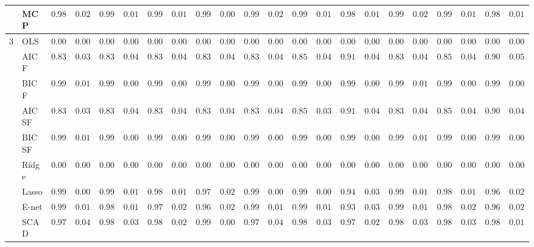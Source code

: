 \begin{tabular}{p{0.2cm}p{1cm}|p{0.6cm}p{0.6cm}|p{0.6cm}p{0.6cm}p{0.6cm}p{0.6cm}p{0.6cm}p{0.6cm}|p{0.6cm}p{0.6cm}p{0.6cm}p{0.6cm}p{0.6cm}p{0.6cm}|p{0.6cm}p{0.6cm}p{0.6cm}p{0.6cm}p{0.6cm}p{0.6cm}}
 & MCP  & $0.9898$ & $0.0211$ & $0.9920$ & $0.0165$ & $0.9941$ & $0.0178$ & $0.9977$ & $0.0083$ & $0.9916$ & $0.0223$ & $0.9922$ & $0.0189$ & $0.9844$ & $0.0165$ & $0.9908$ & $0.0203$ & $0.9956$ & $0.0101$ & $0.9876$ & $0.0140$ \\\hline
3 & OLS  & $0.0000$ & $0.0000$ & $0.0000$ & $0.0000$ & $0.0000$ & $0.0000$ & $0.0000$ & $0.0000$ & $0.0000$ & $0.0000$ & $0.0000$ & $0.0000$ & $0.0000$ & $0.0000$ & $0.0000$ & $0.0000$ & $0.0000$ & $0.0000$ & $0.0000$ & $0.0000$ \\
 & AIC F  & $0.8329$ & $0.0391$ & $0.8353$ & $0.0419$ & $0.8341$ & $0.0421$ & $0.8306$ & $0.0481$ & $0.8366$ & $0.0447$ & $0.8506$ & $0.0408$ & $0.9124$ & $0.0434$ & $0.8367$ & $0.0438$ & $0.8538$ & $0.0428$ & $0.9071$ & $0.0505$ \\
 & BIC F  & $0.9905$ & $0.0112$ & $0.9928$ & $0.0099$ & $0.9919$ & $0.0087$ & $0.9922$ & $0.0088$ & $0.9906$ & $0.0098$ & $0.9932$ & $0.0076$ & $0.9960$ & $0.0061$ & $0.9901$ & $0.0103$ & $0.9929$ & $0.0087$ & $0.9967$ & $0.0071$ \\
 & AIC SF  & $0.8334$ & $0.0389$ & $0.8364$ & $0.0413$ & $0.8354$ & $0.0403$ & $0.8316$ & $0.0474$ & $0.8377$ & $0.0436$ & $0.8530$ & $0.0397$ & $0.9152$ & $0.0421$ & $0.8390$ & $0.0416$ & $0.8548$ & $0.0421$ & $0.9080$ & $0.0494$ \\
 & BIC SF  & $0.9905$ & $0.0112$ & $0.9928$ & $0.0099$ & $0.9919$ & $0.0087$ & $0.9922$ & $0.0088$ & $0.9906$ & $0.0098$ & $0.9932$ & $0.0076$ & $0.9960$ & $0.0061$ & $0.9902$ & $0.0100$ & $0.9929$ & $0.0087$ & $0.9967$ & $0.0071$ \\
 & Ridge  & $0.0000$ & $0.0000$ & $0.0000$ & $0.0000$ & $0.0000$ & $0.0000$ & $0.0000$ & $0.0000$ & $0.0000$ & $0.0000$ & $0.0000$ & $0.0000$ & $0.0000$ & $0.0000$ & $0.0000$ & $0.0000$ & $0.0000$ & $0.0000$ & $0.0000$ & $0.0000$ \\
 & Lasso  & $0.9969$ & $0.0087$ & $0.9936$ & $0.0141$ & $0.9882$ & $0.0161$ & $0.9788$ & $0.0243$ & $0.9960$ & $0.0086$ & $0.9954$ & $0.0089$ & $0.9436$ & $0.0320$ & $0.9943$ & $0.0129$ & $0.9874$ & $0.0174$ & $0.9696$ & $0.0209$ \\
 & E-net  & $0.9943$ & $0.0145$ & $0.9883$ & $0.0195$ & $0.9778$ & $0.0222$ & $0.9696$ & $0.0268$ & $0.9934$ & $0.0124$ & $0.9906$ & $0.0145$ & $0.9311$ & $0.0361$ & $0.9907$ & $0.0168$ & $0.9804$ & $0.0229$ & $0.9617$ & $0.0225$ \\
 & SCAD  & $0.9791$ & $0.0413$ & $0.9828$ & $0.0353$ & $0.9889$ & $0.0207$ & $0.9972$ & $0.0082$ & $0.9785$ & $0.0443$ & $0.9846$ & $0.0384$ & $0.9727$ & $0.0277$ & $0.9834$ & $0.0349$ & $0.9840$ & $0.0310$ & $0.9826$ & $0.0174$ \\

\end{tabular}

